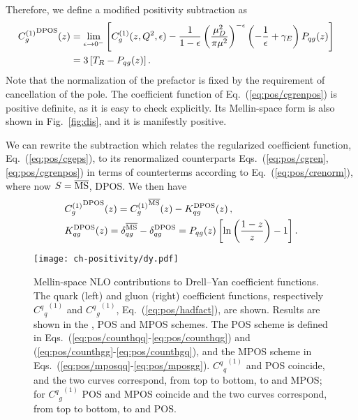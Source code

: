Therefore, we define a modified positivity subtraction as
\begin{align}\label{eq:pos/cgrenpos}
  \hspace*{-1em}{C^{(1)}_{g}}^{\textrm{DPOS}}(z) &= \lim_{\epsilon\to0^-}
  \left[{C^{(1)}_{g}}(z,Q^2,\epsilon) - \frac{1}{1-\epsilon}\left(\frac{\mu_D^2}{\pi\mu^2}\right)^{-\epsilon} \left(-\frac 1
    {\epsilon}+\gamma_E\right) P_{qg}(z)\right]\\\label{eq:pos/cgrenpos1}
    &= 3\left[T_R- P_{qg}(z)\right].
\end{align}
Note that the normalization of the prefactor is fixed by the
requirement of cancellation of the pole.
The coefficient function of Eq.~(\ref{eq:pos/cgrenpos}) is positive definite,
as it is easy to check explicitly. Its Mellin-space form is also shown
in Fig.~\ref{fig:dis}, and it is manifestly positive.

We
can rewrite the subtraction which relates  the regularized
coefficient function, Eq.~(\ref{eq:pos/cgeps}), to its renormalized
counterparts Eqs.~(\ref{eq:pos/cgren},\ref{eq:pos/cgrenpos}) in terms of
counterterms according to Eq.~(\ref{eq:pos/crenorm}), where now
$S={\overline{\textrm{MS}}}$, DPOS.
We then have 
\begin{align}\label{eq:pos/count}
  &   {C^{(1)}_{g}}^{\textrm{DPOS}}(z) =  {C^{(1)}_{g}}^{{\overline{\textrm{MS}}}}(z) -
  K_{qg}^{\textrm{DPOS}}(z) \,,\\ \label{eq:pos/count1}
  &  K_{qg}^{\textrm{DPOS}}(z)=\delta_{qg}^{{\overline{\textrm{MS}}}}-\delta_{qg}^{\textrm{DPOS}}=  P_{qg}(z)\left[\ln\left(\frac{1-z}{z}\right) - 1\right].
\end{align}


\begin{figure}[t]
  \begin{center}
    \texttt{[image: ch-positivity/dy.pdf]}
    \caption{\small Mellin-space NLO contributions to Drell--Yan coefficient
      functions. The quark (left) and gluon (right) coefficient
      functions, respectively  ${{{C^q}_q}^{(1)}}$ and  ${{{C^q}_g}^{(1)}}$, Eq.~(\ref{eq:pos/hadfact}), are
      shown.
      Results are shown in the \msbar{}, POS and MPOS schemes. The POS
      scheme is defined in Eqs.~(\ref{eq:pos/counthqq}-\ref{eq:pos/counthqg})
      and (\ref{eq:pos/counthgg}-\ref{eq:pos/counthgq}), and the MPOS scheme
      in Eqs.~(\ref{eq:pos/mposqq}-\ref{eq:pos/mposgg}).
 ${{{C^q}_q}^{(1)}}$ \msbar{} and POS coincide, and the two curves
      correspond, from top to bottom, to \msbar{} and MPOS; for  
      ${{{C^q}_g}^{(1)}}$ POS and MPOS coincide and the two curves
      correspond, from top to bottom, to \msbar{} and POS. 
    \label{fig:dy} }
  \end{center}
\end{figure}
